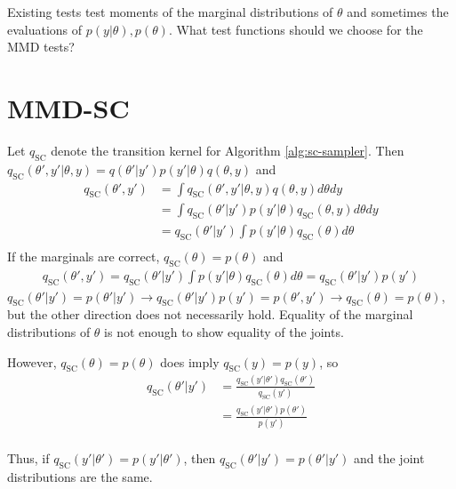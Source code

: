 \documentclass[a4paper,11pt]{article}
\begin{document}
Existing tests test moments of the marginal distributions of $\theta$ and sometimes the evaluations of $p(y|\theta), p(\theta)$. What test functions should we choose for the MMD tests?

\section{MMD-SC}

Let $q_{\text{SC}}$ denote the transition kernel for Algorithm \ref{alg:sc-sampler}. Then $q_{\text{SC}}(\theta', y' | \theta, y) = q(\theta' | y') p(y' | \theta) q(\theta, y)$ and 
\begin{align*}
    q_{\text{SC}}(\theta', y') &= \int q_{\text{SC}}(\theta', y' | \theta, y) q(\theta, y) d\theta dy \\
                    &= \int q_{\text{SC}}(\theta' | y') p(y' | \theta) q_{\text{SC}}(\theta, y) d\theta dy \\
                    &= q_{\text{SC}}(\theta' | y') \int p(y' | \theta) q_{\text{SC}}(\theta) d\theta \\
\end{align*}
If the marginals are correct, $q_{\text{SC}}(\theta) = p(\theta)$ and
\begin{align*}
    q_{\text{SC}}(\theta', y') = q_{\text{SC}}(\theta' | y') \int p(y' | \theta) q_{\text{SC}}(\theta) d\theta = q_{\text{SC}}(\theta' | y') p(y')
\end{align*}
$q_{\text{SC}}(\theta' | y') = p(\theta'|y') \rightarrow q_{\text{SC}}(\theta' | y') p(y') = p(\theta', y') \rightarrow q_{\text{SC}}(\theta) = p(\theta) $, but the other direction does not necessarily hold. Equality of the marginal distributions of $\theta$ is not enough to show equality of the joints.

However, $q_{\text{SC}}(\theta) = p(\theta)$ does imply $q_{\text{SC}}(y) = p(y)$, so
\begin{align*}
    q_{\text{SC}}(\theta' | y') &= \frac{q_{\text{SC}}(y' | \theta') q_{\text{SC}}(\theta')}{q_{\text{SC}}(y')} \\
                                &= \frac{q_{\text{SC}}(y' | \theta') p(\theta')}{p(y')} \\
\end{align*}

Thus, if $q_{\text{SC}}(y' | \theta') = p(y' | \theta')$, then $q_{\text{SC}}(\theta' | y') = p(\theta' | y')$ and the joint distributions are the same. 
\end{document}
